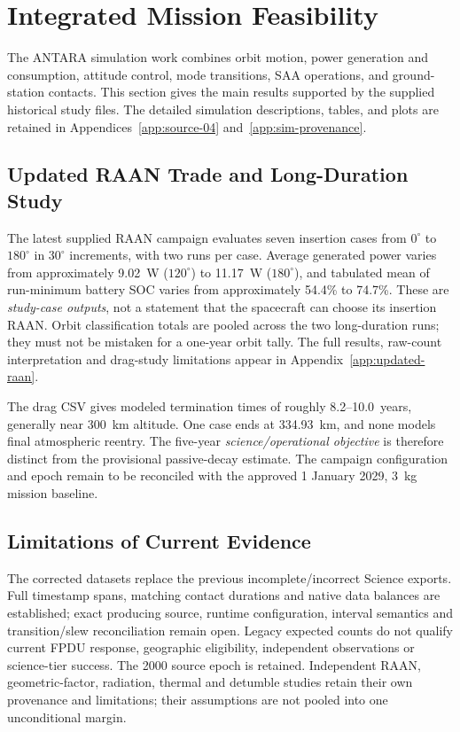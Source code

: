 \section{Integrated Mission Feasibility}\label{sec:simulation-results}
The ANTARA simulation work combines orbit motion, power generation and consumption, attitude control, mode transitions, SAA operations, and ground-station contacts. This section gives the main results supported by the supplied historical study files. The detailed simulation descriptions, tables, and plots are retained in Appendices~\ref{app:source-04} and~\ref{app:sim-provenance}.



\subsection{Updated RAAN Trade and Long-Duration Study}\label{sec:sim-annual}
The latest supplied RAAN campaign evaluates seven insertion cases from $0^\circ$ to $180^\circ$ in $30^\circ$ increments, with two runs per case. Average generated power varies from approximately 9.02~W ($120^\circ$) to 11.17~W ($180^\circ$), and tabulated mean of run-minimum battery SOC varies from approximately 54.4\% to 74.7\%. These are \emph{study-case outputs}, not a statement that the spacecraft can choose its insertion RAAN. Orbit classification totals are pooled across the two long-duration runs; they must not be mistaken for a one-year orbit tally. The full results, raw-count interpretation and drag-study limitations appear in Appendix~\ref{app:updated-raan}.

The drag CSV gives modeled termination times of roughly 8.2--10.0~years, generally near 300~km altitude. One case ends at 334.93~km, and none models final atmospheric reentry. The five-year \emph{science/operational objective} is therefore distinct from the provisional passive-decay estimate. The campaign configuration and epoch remain to be reconciled with the approved 1 January 2029, 3~kg mission baseline.

\subsection{Limitations of Current Evidence}\label{sec:sim-consolidated}
The corrected datasets replace the previous incomplete/incorrect Science exports. Full timestamp spans, matching contact durations and native data balances are established; exact producing source, runtime configuration, interval semantics and transition/slew reconciliation remain open. Legacy expected counts do not qualify current FPDU response, geographic eligibility, independent observations or science-tier success. The 2000 source epoch is retained. Independent RAAN, geometric-factor, radiation, thermal and detumble studies retain their own provenance and limitations; their assumptions are not pooled into one unconditional margin.
